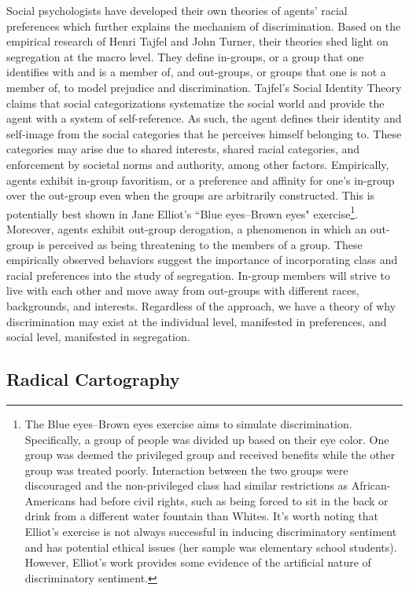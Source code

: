 \documentclass[11pt]{asaproc}
\newcommand{\1}{\mathbb{1}}
\begin{document}
Social psychologists have developed their own theories of agents' racial preferences which further explains the mechanism of discrimination. Based on the empirical research of Henri Tajfel and John Turner, their theories shed light on segregation at the macro level\citep{tajfel79}. They define in-groups, or a group that one identifies with and is a member of, and out-groups, or groups that one is not a member of, to model prejudice and discrimination. Tajfel's Social Identity Theory claims that social categorizations systematize the social world and provide the agent with a system of self-reference. As such, the agent defines their identity and self-image from the social categories that he perceives himself belonging to. These categories may arise due to shared interests, shared racial categories, and enforcement by societal norms and authority, among other factors. Empirically, agents exhibit in-group favoritism, or a preference and affinity for one's in-group over the out-group even when the groups are arbitrarily constructed. This is potentially best shown in Jane Elliot's ``Blue eyes–Brown eyes" exercise\footnote{The Blue eyes–Brown eyes exercise aims to simulate discrimination. Specifically, a group of people was divided up based on their eye color. One group was deemed the privileged group and received benefits while the other group was treated poorly. Interaction between the two groups were discouraged and the non-privileged class had similar restrictions as African-Americans had before civil rights, such as being forced to sit in the back or drink from a different water fountain than Whites. It's worth noting that Elliot's exercise is not always successful in inducing discriminatory sentiment and has potential ethical issues (her sample was elementary school students). However, Elliot's work provides some evidence of the artificial nature of discriminatory sentiment.}. Moreover, agents exhibit out-group derogation, a phenomenon in which an out-group is perceived as being threatening to the members of a group. These empirically observed behaviors suggest the importance of incorporating class and racial preferences into the study of segregation. In-group members will strive to live with each other and move away from out-groups with different races, backgrounds, and interests. Regardless of the approach, we have a theory of why discrimination may exist at the individual level, manifested in preferences, and social level, manifested in segregation.

\subsection{Radical Cartography}
\end{document}
